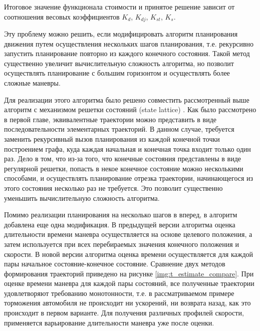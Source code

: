 Итоговое значение функционала стоимости и принятое решение зависит от соотношения весовых коэффициентов $K_d$, $K_{dj}$,
$K_{st}$, $K_s$.

Эту проблему можно решить, если модифицировать алгоритм планирования движения путем осуществления нескольких шагов
планирования, т.е. рекурсивно запустить планирование повторно из каждого конечного состояния. Такой метод существенно
увеличит вычислительную сложность алгоритма, но позволит осуществлять планирование с большим горизонтом и осуществлять
более сложные маневры.

Для реализации этого алгоритма было решено совместить рассмотренный выше алгоритм с механизмом решетки состояний
(state lattice) \cite{motion_planning_lattice_1}. Как было рассмотрено в первой главе, эквивалентные траектории
можно представить в виде последовательности элементарных траекторий. В данном случае, требуется заменить рекурсивный
вызов планирования из каждой конечной точки построением графа, куда каждая начальная и конечная точка входит только один
раз. Дело в том, что из-за того, что конечные состояния представлены в виде регулярной решетки, попасть в некое
конечное состояние можно несколькими способами, и осуществлять планирование отрезка траектории, начинающегося из
этого состояния несколько раз не требуется. Это позволит существенно уменьшить вычислительную сложность алгоритма.

Помимо реализации планирования на несколько шагов в вперед, в алгоритм добавлена еще одна модификация. В предыдущей
версии алгоритма оценка длительности времени маневра осуществляется на основе целевого положения, а затем используется
при всех перебираемых значения конечного положения и скорости. В новой версии алгоритма оценка времени осуществляется
для каждой пары начальное состояние-конечное состояние. Сравнение двух методов формирования траекторий приведено
на рисунке \ref{img:t_estimate_compare}. При оценке времени маневра для каждой пары состояний, все полученные
траектории удовлетворяют требованию монотонности, т.е. в рассматриваемом примере торможения автомобиля не происходит
ни ускорений, ни возврата назад, как это происходит в первом варианте. Для получения различных профилей скорости,
применяется варьирование длительности маневра уже после оценки.

